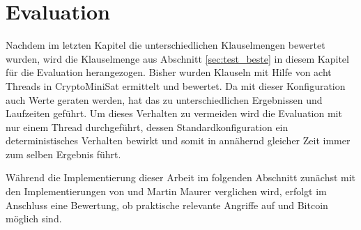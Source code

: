 \chapter{Evaluation}
\label{chp:evaluation}

Nachdem im letzten Kapitel die unterschiedlichen Klauselmengen bewertet wurden, wird die Klauselmenge aus Abschnitt \ref{sec:test_beste}
in diesem Kapitel für die Evaluation herangezogen. Bisher wurden Klauseln mit Hilfe von acht Threads in CryptoMiniSat ermittelt und bewertet.
Da mit dieser Konfiguration auch Werte geraten werden, hat das zu unterschiedlichen Ergebnissen und Laufzeiten geführt. Um dieses Verhalten
zu vermeiden wird die Evaluation mit nur einem Thread durchgeführt, dessen Standardkonfiguration ein deterministisches Verhalten bewirkt
und somit in annähernd gleicher Zeit immer zum selben Ergebnis führt.

Während die Implementierung dieser Arbeit im folgenden Abschnitt zunächst mit den Implementierungen von  und Martin Maurer verglichen wird,
erfolgt im Anschluss eine Bewertung, ob praktische relevante Angriffe auf  und Bitcoin möglich sind.



